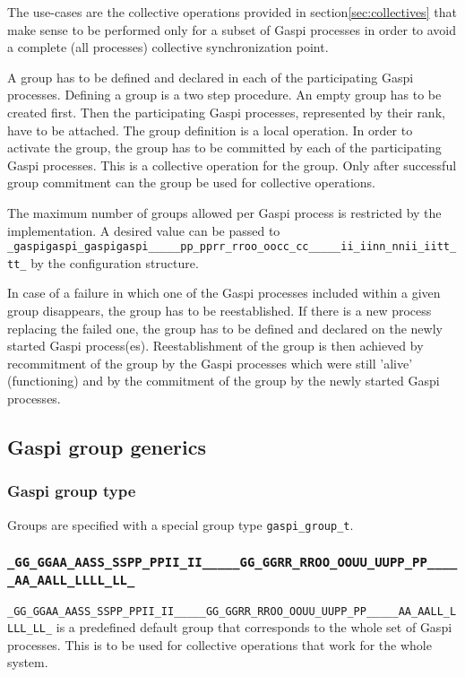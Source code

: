 \documentclass{article}
\makeatletter
\newcommand{\secref}[1]{section\xspace\ref{#1}}
\newlength{\st}\setlength{\st}{0pt}
\newcommand{\zerowsep}{\hskip 0pt plus 0.1pt minus 0.1pt}
\newcommand{\ZSEP}[1]{\ifx#1\@@@EOZ@@@\let\next\relax\else\ifx#1\_#1\zerowsep\else#1\fi\let\next\ZSEP\fi\next}
\newcommand{\zsep}[1]{\ZSEP{}#1\@@@EOZ@@@}
\newcommand{\gaspiprefix}{gaspi}
\newcommand{\GASPI}{{\sc Gaspi}}
\newcommand{\function}[1]{{\tt #1}}
\newcommand{\gaspifunction}[1]{\function{\protect\zsep{\gaspiprefix\_#1}}}
\newcommand{\GASPIGROUPALL}{{\tt\protect\zsep{GASPI\_GROUP\_ALL}}}
\makeatother
\begin{document}
The use-cases are the collective operations provided in \secref{sec:collectives}
that make sense to be performed only for a subset of \GASPI{} processes
in order to avoid a complete (all processes) collective synchronization
point.

A group has to be defined and declared in each of the participating
\GASPI{} processes. Defining a group is a two step procedure. 
An empty group has to be created first. Then the participating \GASPI{}
processes, represented by their rank, have to be attached. The group
definition is a local operation.  In order to activate the group, the
group has to be committed by each of the participating \GASPI{}
processes. This is a collective operation for the group. Only after
successful group commitment can the group be used for collective
operations.

The maximum number of  groups allowed per \GASPI{} process is restricted by the
implementation. A desired value can be passed to \gaspifunction{proc\_init} by
the configuration structure.

In case of a failure in which one of the \GASPI{} processes
included within a given group disappears, the group has to be
reestablished. If there is a new process replacing the failed one, the
group has to be defined and declared on the newly started \GASPI{}
process(es).  Reestablishment of the group is then achieved by
recommitment of the group by the \GASPI{} processes which were still
'alive' (functioning) and by the commitment of the group by the newly started \GASPI{}
processes.

\subsection{\GASPI{} group generics}

\subsubsection{\GASPI{} group type}

Groups are specified with a special group type \verb|gaspi_group_t|.

\subsubsection{\GASPIGROUPALL{}}

\GASPIGROUPALL{} is a predefined default group that corresponds
to the whole set of \GASPI{} processes. This is to be used for collective
operations that work for the whole system.
\end{document}
